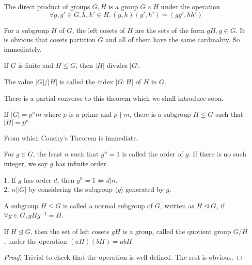\begin{definition}
    The direct product of groups $G,H$ is a group $G\times H$ under the operation
    $$\forall g,g'\in G,h,h'\in H,(g,h)(g',h')=(gg',hh')$$ 
\end{definition}
For a subgroup $H$ of $G$, the left cosets of $H$ are the sets of the form $gH,g\in G$.
It is obvious that cosets partition $G$ and all of them have the same cardinality.
So immediately,
\begin{theorem}
    If $G$ is finite and $H\le G$, then $|H|$ divides $|G|$.
\end{theorem}
\begin{definition}
    The value $|G|/|H|$ is called the index $|G:H|$ of $H$ in $G$.
\end{definition}
There is a partial converse to this theorem which we shall introduce soon.
\begin{theorem}
    If $|G|=p^nm$ where $p$ is a prime and $p\nmid m$, there is a subgroup $H\le G$ such that $|H|=p^n$
\end{theorem}
From which Cauchy's Theorem is immediate.
\begin{definition}
    For $g\in G$, the least $n$ such that $g^n=1$ is called the order of $g$.
    If there is no such integer, we say $g$ has infinite order.
\end{definition}
\begin{remark}
    1. If $g$ has order $d$, then $g^n=1\iff d|n$.\\
    2. $n||G|$ by considering the subgroup $\langle g\rangle$ generated by $g$.
\end{remark}
\begin{definition}
    A subgroup $H\le G$ is called a normal subgroup of $G$, written as $H\unlhd G$, if $\forall g\in G,gHg^{-1}=H$.
\end{definition}
\begin{proposition}
    If $H\unlhd G$, then the set of left cosets $gH$ is a group, called the quotient group $G/H$, under the operation $(aH)(bH)=abH$.
\end{proposition}
\begin{proof}
    Trivial to check that the operation is well-defined.
    The rest is obvious.
\end{proof}
